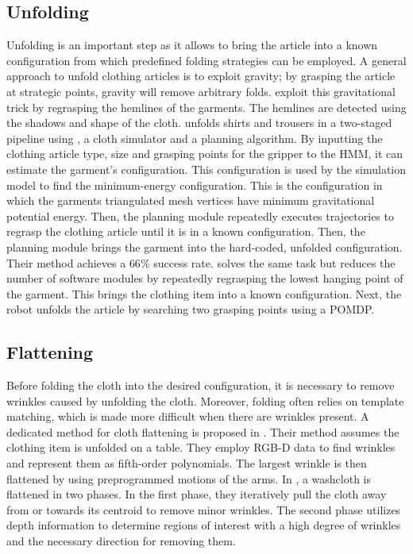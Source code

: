 \subsection{Unfolding}
Unfolding is an important step as it allows to bring the article into a known configuration from which predefined folding strategies can be employed. A general approach to unfold clothing articles is to exploit gravity; by grasping the article at strategic points, gravity will remove arbitrary folds. \Textcite{Hamajima1998} exploit this gravitational trick by regrasping the hemlines of the garments. The hemlines are detected using the shadows and shape of the cloth. \textcite{Cusumano2011} unfolds shirts and trousers in a two-staged pipeline using , a cloth simulator and a planning algorithm. By inputting the clothing article type, size and grasping points for the gripper to the \acrshort{HMM}, it can estimate the garment's configuration. This configuration is used by the simulation model to find the minimum-energy configuration. This is the configuration in which the garments triangulated mesh vertices have minimum gravitational potential energy. Then, the planning module repeatedly executes trajectories to regrasp the clothing article until it is in a known configuration. Then, the planning module brings the garment into the hard-coded, unfolded configuration. Their method achieves a $66\%$ success rate. \textcite{Doumanoglou2014} solves the same task but reduces the number of software modules by repeatedly regrasping the lowest hanging point of the garment. This brings the clothing item into a known configuration. Next, the robot unfolds the article by searching two grasping points using a \acrshort{POMDP}.

\subsection{Flattening}
Before folding the cloth into the desired configuration, it is necessary to remove wrinkles caused by unfolding the cloth. 
Moreover, folding often relies on template matching, which is made more difficult when there are wrinkles present. A dedicated method for cloth flattening is proposed in \autocite{Sun2015}. Their method assumes the clothing item is unfolded on a table. They employ RGB-D data to find wrinkles and represent them as fifth-order polynomials. The largest wrinkle is then flattened by using preprogrammed motions of the arms. In \autocite{Willimon2011}, a washcloth is flattened in two phases. In the first phase, they iteratively pull the cloth away from or towards its centroid to remove minor wrinkles. The second phase utilizes depth information to determine regions of interest with a high degree of wrinkles and the necessary direction for removing them.

